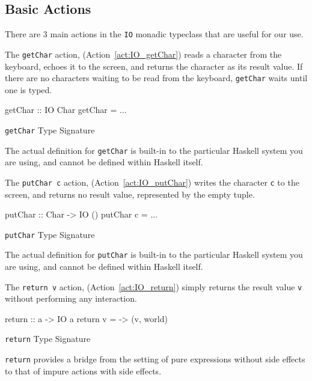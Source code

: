 \subsection{Basic \texorpdfstring{}{\texttt{IO}} Actions}\label{subsec:Basic_IO_Actions}
There are 3 main actions in the \texttt{IO} monadic typeclass that are useful for our use.
\begin{nocrefenumerate}
\item {}\label{act:IO_getChar}
\item {}\label{act:IO_putChar}
\item {}\label{act:IO_return}
\end{nocrefenumerate}

The \texttt{getChar} action, (Action~\ref{act:IO_getChar}) reads a character from the keyboard, echoes it to the screen, and returns the character as its result value.
If there are no characters waiting to be read from the keyboard, \texttt{getChar} waits until one is typed.
\begin{listing}[h!tbp]
\begin{haskellsource}
getChar :: IO Char
getChar = ...
\end{haskellsource}
\caption{\texttt{getChar} Type Signature}
\label{lst:IO_getChar_Type}
\end{listing}
The actual definition for \texttt{getChar} is built-in to the particular Haskell system you are using, and cannot be defined within Haskell itself.

The \texttt{putChar c} action, (Action~\ref{act:IO_putChar}) writes the character \texttt{c} to the screen, and returns no result value, represented by the empty tuple.
\begin{listing}[h!tbp]
\begin{haskellsource}
putChar :: Char -> IO ()
putChar c = ...
\end{haskellsource}
\caption{\texttt{putChar} Type Signature}
\label{lst:IO_putChar_Type}
\end{listing}
The actual definition for \texttt{putChar} is built-in to the particular Haskell system you are using, and cannot be defined within Haskell itself.

The \texttt{return v} action, (Action~\ref{act:IO_return}) simply returns the result value \texttt{v} without performing any interaction.
\begin{listing}[h!tbp]
\begin{haskellsource}
return :: a -> IO a
return v = \world -> (v, world)
\end{haskellsource}
\caption{\texttt{return} Type Signature}
\label{lst:IO_return_Type}
\end{listing}
\texttt{return} provides a bridge from the setting of pure expressions without side effects to that of impure actions with side effects.

